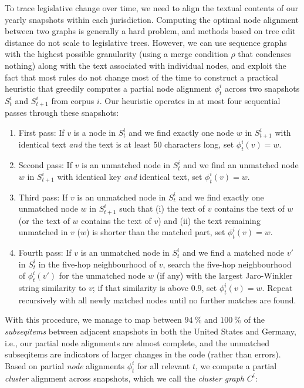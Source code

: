 To trace legislative change over time, we need to align the textual contents of our yearly snapshots within each jurisdiction. 
Computing the optimal node alignment between two graphs is generally a hard problem, 
and methods based on tree edit distance do not scale to legislative trees. 
However, we can use sequence graphs with the highest possible granularity 
(using a merge condition $\rho$ that condenses nothing)
along with the text associated with individual nodes, 
and exploit the fact that most rules do not change most of the time 
to construct a practical heuristic that greedily computes a partial node alignment $\phi^i_t$ across two snapshots $S^i_t$ and $S^i_{t+1}$ from corpus $i$. 
Our heuristic operates in at most four sequential passes through these snapshots:

\begin{enumerate}
	\item First pass: 
	If $v$ is a node in $S^i_t$ and we find exactly one node $w$ in $S^i_{t+1}$ with identical text \emph{and} the text is at least 50 characters long, set $\phi^i_t(v) = w$.
	\item Second pass: 
	If $v$ is an unmatched node in $S^i_t$ and we find an unmatched node $w$ in $S^i_{t+1}$ with identical key \emph{and} identical text, 
	set $\phi^i_t(v) = w$.
	\item Third pass: 
	If $v$ is an unmatched node in $S^i_t$ and we find exactly one unmatched node $w$ in $S^i_{t+1}$ such that (i) the text of $v$ contains the text of $w$ (or the text of $w$ contains the text of $v$) and (ii) the text remaining unmatched in $v$ ($w$) is shorter than the matched part, set $\phi^i_t(v) = w$.
	\item Fourth pass: 
	If $v$ is an unmatched node in $S^i_t$ and we find a matched node $v'$ in $S^i_t$ in the five-hop neighbourhood of $v$, 
	search the five-hop neighbourhood of $\phi^i_t(v')$ for the unmatched node $w$ (if any) with the largest Jaro-Winkler string similarity\cite{winkler1990} to $v$; 
	if that similarity is above $0.9$, set $\phi^i_t(v) = w$.
	Repeat recursively with all newly matched nodes until no further matches are found.
\end{enumerate}

With this procedure, we manage to map between $94~\%$ and $100~\%$ of the \emph{subseqitems} between adjacent snapshots in both the United States and Germany, i.e., our partial node alignments are almost complete, 
and the unmatched subseqitems are indicators of larger changes in the code (rather than errors). 
Based on partial \emph{node} alignments $\phi^i_t$ for all relevant $t$, we compute a partial \emph{cluster} alignment across snapshots, 
which we call the \emph{cluster graph} $C^i$:


